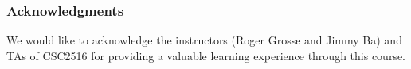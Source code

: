 \documentclass{article}
\begin{document}
\subsubsection*{Acknowledgments}

We would like to acknowledge the instructors (Roger Grosse and Jimmy Ba) and TAs of CSC2516 for providing a valuable learning experience through this course.



%
%
%
%
%
\end{document}
